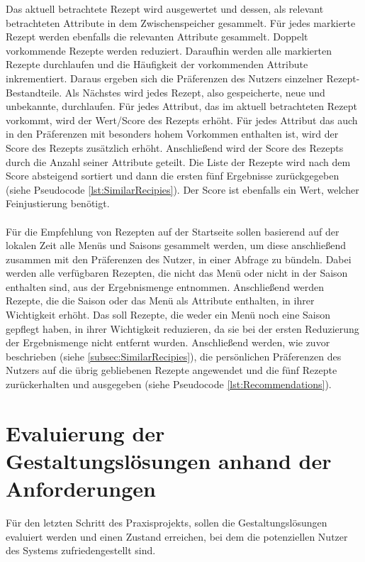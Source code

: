 Das aktuell betrachtete Rezept wird ausgewertet und dessen, als relevant betrachteten Attribute in dem Zwischenspeicher gesammelt. Für jedes markierte Rezept werden ebenfalls die relevanten Attribute gesammelt. Doppelt vorkommende Rezepte werden reduziert. Daraufhin werden alle markierten Rezepte durchlaufen und die Häufigkeit der vorkommenden Attribute inkrementiert. Daraus ergeben sich die Präferenzen des Nutzers einzelner Rezept-Bestandteile. Als Nächstes wird jedes Rezept, also gespeicherte, neue und unbekannte, durchlaufen. Für jedes Attribut, das im aktuell betrachteten Rezept  vorkommt, wird der Wert/Score des Rezepts erhöht. Für jedes Attribut das auch in den Präferenzen mit besonders hohem Vorkommen enthalten ist, wird der Score des Rezepts zusätzlich erhöht. Anschließend wird der Score des Rezepts durch die Anzahl seiner Attribute geteilt. Die Liste der Rezepte wird nach dem Score absteigend sortiert und dann die ersten fünf Ergebnisse zurückgegeben (siehe Pseudocode \ref{lst:SimilarRecipies}). Der Score ist ebenfalls ein Wert, welcher Feinjustierung benötigt.
\\ 
\label{subsec:Recommendations}
\\
Für die Empfehlung von Rezepten auf der Startseite sollen basierend auf der lokalen Zeit alle Menüs und Saisons gesammelt werden, um diese anschließend zusammen mit den Präferenzen des Nutzer, in einer Abfrage zu bündeln. Dabei werden alle verfügbaren Rezepten, die nicht das Menü oder nicht in der Saison enthalten sind, aus der Ergebnismenge entnommen. Anschließend werden Rezepte, die die Saison oder das Menü als Attribute enthalten, in ihrer Wichtigkeit erhöht. Das soll Rezepte, die weder ein Menü noch eine Saison gepflegt haben, in ihrer Wichtigkeit reduzieren, da sie bei der ersten Reduzierung der Ergebnismenge nicht entfernt wurden. Anschließend werden, wie zuvor beschrieben (siehe \ref{subsec:SimilarRecipies}), die persönlichen Präferenzen des Nutzers auf die übrig gebliebenen Rezepte angewendet und die fünf Rezepte zurückerhalten und ausgegeben (siehe Pseudocode \ref{lst:Recommendations}). \\

\chapter{Evaluierung der Gestaltungslösungen anhand der Anforderungen}
Für den letzten Schritt des Praxisprojekts, sollen die Gestaltungslösungen evaluiert werden und einen Zustand erreichen, bei dem die potenziellen Nutzer des Systems zufriedengestellt sind. \\

